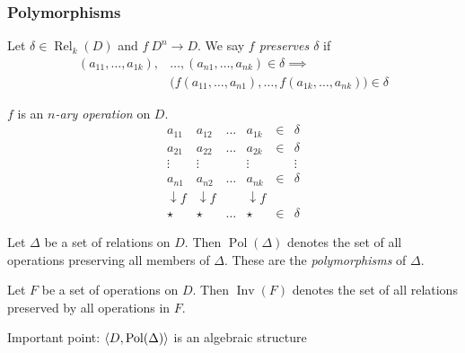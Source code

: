 \documentclass[12pt,xcolor=dvipsnames,mathserif%
   ]{beamer}
\DeclareMathOperator{\Rel}{Rel}
\newcommand{\bigpause}{\pause\bigskip}
\DeclareMathOperator{\Pol}{Pol}
\DeclareMathOperator{\Inv}{Inv}
\renewcommand{\.}{\cdot}
\begin{document}
\begin{frame}
  \frametitle{Polymorphisms}

  \begin{definition}
    Let $\delta \in \Rel_k(D)$ and $f\: D^n \to D$. We say 
    \emph{$f$ preserves $\delta$} if
    \begin{equation*}
      \begin{split}
        (a_{11}, \dots, a_{1k}),&\dots, (a_{n1},\dots, a_{nk}) \in
        \delta \implies\\ 
        &\bigl( f(a_{11},\dots, a_{n1}), \dots, f(a_{1k},\dots,a_{nk})
        \bigr) \in \delta
    \end{split}
    \end{equation*}

  \end{definition}

  \begin{overprint}
  $f$ is an \emph{$n$-ary operation} on $D$.
    \begin{equation*}
      \newcommand\flab{\scriptstyle{f}}
      \begin{matrix} a_{11} & a_{12} & \dots & a_{1k} & \in & \delta \\
        a_{21} & a_{22} & \dots & a_{2k} & \in & \delta \\
        \vdots  & \vdots &       &\vdots  &     & \vdots \\
        a_{n1} & a_{n2} & \dots & a_{nk} & \in & \delta \\
        \downarrow\flab &\downarrow\flab &  & \downarrow\flab \\
        \star  & \star  & \dots & \star  & \in & \delta
      \end{matrix}
    \end{equation*}
  \end{overprint}
\end{frame}

\begin{frame}
  \begin{definition}
    Let $\Delta$ be a set of relations on $D$. Then
    \emph{$\Pol(\Delta)$} denotes the set of all operations preserving
    all members of $\Delta$. These are the \emph{polymorphisms} of
    $\Delta$. 

    \bigpause

    Let $F$ be a set of operations on $D$. Then \emph{$\Inv(F)$} denotes
    the set of all relations preserved by all operations in $F$.
  \end{definition}
  
  \bigpause
Important point: $\<D,\Pol(\Delta)\>$ is an algebraic structure

\end{frame}
\end{document}
